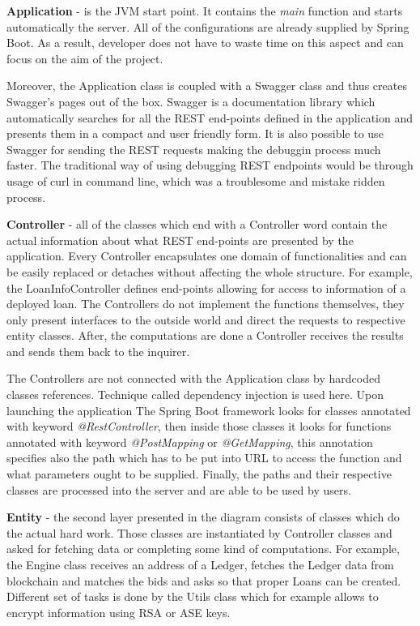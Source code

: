 \documentclass[a4paper,12pt,twoside,openany]{report}
\begin{document}
\textbf{Application} - is the JVM start point. It contains the \textit{main} function and starts automatically the server. All of the configurations are already supplied by Spring Boot. As a result, developer does not have to waste time on this aspect and can focus on the aim of the project. 

Moreover, the Application class is coupled with a Swagger class and thus creates Swagger's pages out of the box. Swagger is a documentation library which automatically searches for all the REST end-points defined in the application and presents them in a compact and user friendly form. It is also possible to use Swagger for sending the REST requests making the debuggin process much faster. The traditional way of using debugging REST endpoints would be through usage of curl in command line, which was a troublesome and mistake ridden process.

\textbf{Controller} - all of the classes which end with a Controller word contain the actual information about what REST end-points are presented by the application. Every Controller encapsulates one domain of functionalities and can be easily replaced or detaches without affecting the whole structure. For example, the LoanInfoController defines end-points allowing for access to information of a deployed loan. The Controllers do not implement the functions themselves, they only present interfaces to the outside world and direct the requests to respective entity classes. After, the computations are done a Controller receives the results and sends them back to the inquirer. 

The Controllers are not connected with the Application class by hardcoded classes references. Technique called dependency injection is used here. Upon launching the application The Spring Boot framework looks for classes annotated with keyword \textit{@RestController}, then inside those classes it looks for functions annotated with keyword \textit{@PostMapping} or \textit{@GetMapping}, this annotation specifies also the path which has to be put into URL to access the function and what parameters ought to be supplied. Finally, the paths and their respective classes are processed into the server and are able to be used by users.

\textbf{Entity} - the second layer presented in the diagram consists of classes which do the actual hard work. Those classes are instantiated by Controller classes and asked for fetching data or completing some kind of computations. For example, the Engine class receives an address of a Ledger, fetches the Ledger data from blockchain and matches the bids and asks so that proper Loans can be created. Different set of tasks is done by the Utils class which for example allows to encrypt information using RSA or ASE keys.
\end{document}
